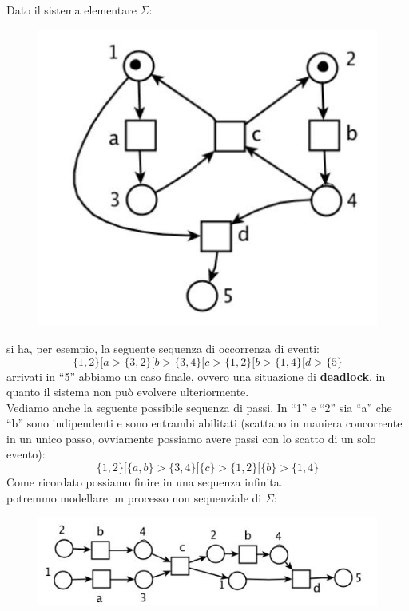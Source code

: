 \newpage
\begin{esempio}
  Dato il sistema elementare $\Sigma$:
  \begin{figure}[H]
    \centering
    \includegraphics[scale = 0.4]{img/seq.jpg}
  \end{figure}
  si ha, per esempio, la seguente sequenza di occorrenza di eventi:
  \[\{1, 2\}[a > \{3, 2\}[b > \{3, 4\}[c > \{1, 2\}[b > \{1, 4\}[d > \{5\}\]
  arrivati in ``5'' abbiamo un caso finale, ovvero una situazione di
  \textbf{deadlock}, in quanto il sistema non può evolvere ulteriormente.\\
  Vediamo anche la seguente possibile sequenza di passi. In ``1'' e ``2'' sia
  ``a'' che ``b'' sono indipendenti e sono entrambi abilitati (scattano in
  maniera concorrente in un unico passo, ovviamente possiamo avere passi con lo
  scatto di un solo evento):
  \[\{1, 2\}[\{a, b\} > \{3, 4\}[\{c\} > \{1, 2\}[\{b\} > \{1, 4\}\]
  Come ricordato possiamo finire in una sequenza infinita.\\
  potremmo modellare un processo non sequenziale di $\Sigma$:
  \begin{figure}[H]
    \centering
    \includegraphics[scale = 0.4]{img/seq5.jpg}
  \end{figure}
\end{esempio}
